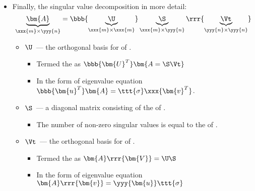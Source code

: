 \begin{itemize}
\begin{itemize}
\begin{itemize}
\begin{itemize}
        \end{itemize}
        \item And that the \hyperref[Column Space]{} of matrices multiplied with their transpose are the same the original matrix column/row space, i.e., 
        \[%
        \yyy{C}(\bm{A\rrr{A^T}}) = \yyy{C}(\bm{\xxx{S}}) = \yyy{C}(\bm{A}), \quad \xxx{R}(\bm{\bbb{A^T} A}) = \xxx{R}(\yyy{\bm{S}}) = \xxx{R}(\bm{A})
        \]%
      \end{itemize}
      \item Finally, the singular value decomposition in more detail:
      \[%
      \underbrace{\bm{A}}_{\xxx{m} \times \yyy{n}} = \bbb{\underbrace{\U}_{\xxx{m} \times \xxx{m}}} \underbrace{\S}_{\xxx{m} \times \yyy{n}} \rrr{\underbrace{\Vt}_{\yyy{n} \times \yyy{n}}}
      \]%
      \begin{itemize}
        \item \(\U\)~--- the orthogonal basis for  of .
          \begin{itemize}
            \item Termed the  as \(\bbb{\bm{U}^T}\bm{A = \S \Vt}\)
            \item In the form of eigenvalue equation \(\bbb{\bm{u}^T}\bm{A}=\ttt{\sigma} \xxx{\bm{v}^T}\).
          \end{itemize}
        \item \(\S\)~--- a diagonal matrix consisting of the  of . 
          \begin{itemize}
            \item The number of non-zero singular values is equal to the \hyperref[Matrix Rank]{} of .
          \end{itemize}
        \item \(\Vt\)~--- the orthogonal basis for  of .
          \begin{itemize}
            \item Termed the  as \(\bm{A}\rrr{\bm{V}} = \U \S\)
            \item In the form of eigenvalue equation \(\bm{A}\rrr{\bm{v}}= \yyy{\bm{u}} \ttt{\sigma}\)
          \end{itemize}
      \end{itemize}
    \end{itemize}
  

\end{itemize}
